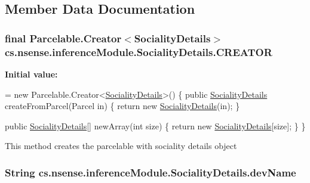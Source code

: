 \subsection{Member Data Documentation}
\hypertarget{classcs_1_1nsense_1_1inference_module_1_1_sociality_details_a6adfb65c097c1aa1a3ee42230c6879dd}{
\subsubsection[{C\-R\-E\-A\-T\-O\-R}]{\setlength{\rightskip}{0pt plus 5cm}final Parcelable.\-Creator$<${\bf Sociality\-Details}$>$ cs.\-nsense.\-inference\-Module.\-Sociality\-Details.\-C\-R\-E\-A\-T\-O\-R\hspace{0.3cm}{\ttfamily [static]}}}\label{classcs_1_1nsense_1_1inference_module_1_1_sociality_details_a6adfb65c097c1aa1a3ee42230c6879dd}
{\bfseries Initial value\-:}
\begin{DoxyCode}
= \textcolor{keyword}{new} Parcelable.Creator<\hyperlink{classcs_1_1nsense_1_1inference_module_1_1_sociality_details_a31376ed8a33d67187e191a5bba7fdeef}{SocialityDetails}>() \{
        \textcolor{keyword}{public} \hyperlink{classcs_1_1nsense_1_1inference_module_1_1_sociality_details_a31376ed8a33d67187e191a5bba7fdeef}{SocialityDetails} createFromParcel(Parcel in) \{
            \textcolor{keywordflow}{return} \textcolor{keyword}{new} \hyperlink{classcs_1_1nsense_1_1inference_module_1_1_sociality_details_a31376ed8a33d67187e191a5bba7fdeef}{SocialityDetails}(in);
        \}

        \textcolor{keyword}{public} \hyperlink{classcs_1_1nsense_1_1inference_module_1_1_sociality_details_a31376ed8a33d67187e191a5bba7fdeef}{SocialityDetails}[] newArray(\textcolor{keywordtype}{int} size) \{
            \textcolor{keywordflow}{return} \textcolor{keyword}{new} \hyperlink{classcs_1_1nsense_1_1inference_module_1_1_sociality_details_a31376ed8a33d67187e191a5bba7fdeef}{SocialityDetails}[size];
        \}
    \}
\end{DoxyCode}
This method creates the parcelable with sociality details object \hypertarget{classcs_1_1nsense_1_1inference_module_1_1_sociality_details_ad7aef6760e509ff3665fd7e47cf05aad}{
\subsubsection[{dev\-Name}]{\setlength{\rightskip}{0pt plus 5cm}String cs.\-nsense.\-inference\-Module.\-Sociality\-Details.\-dev\-Name}}\label{classcs_1_1nsense_1_1inference_module_1_1_sociality_details_ad7aef6760e509ff3665fd7e47cf05aad}
